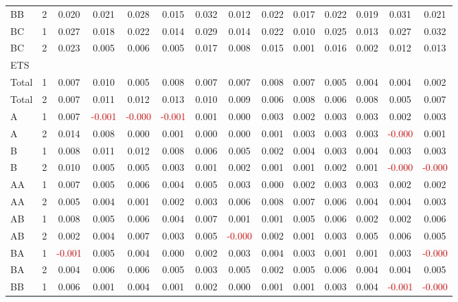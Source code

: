 \begin{table}[!htb]
{\begin{tabular}{llcccccccccccc}
BB & 2 & 0.020 & 0.021 & 0.028 & 0.015 & 0.032 & 0.012 & 0.022 & 0.017 & 0.022 & 0.019 & 0.031 & 0.021\\
BC & 1 & 0.027 & 0.018 & 0.022 & 0.014 & 0.029 & 0.014 & 0.022 & 0.010 & 0.025 & 0.013 & 0.027 & 0.032\\
BC & 2 & 0.023 & 0.005 & 0.006 & 0.005 & 0.017 & 0.008 & 0.015 & 0.001 & 0.016 & 0.002 & 0.012 & 0.013\\
\hline
ETS &  &  &  &  &  &  &  &  &  &  &  &  & \\
\hline
Total & 1 & 0.007 & 0.010 & 0.005 & 0.008 & 0.007 & 0.007 & 0.008 & 0.007 & 0.005 & 0.004 & 0.004 & 0.002\\
Total & 2 & 0.007 & 0.011 & 0.012 & 0.013 & 0.010 & 0.009 & 0.006 & 0.008 & 0.006 & 0.008 & 0.005 & 0.007\\
A & 1 & 0.007 & \textcolor{red}{-0.001} & \textcolor{red}{-0.000} & \textcolor{red}{-0.001} & 0.001 & 0.000 & 0.003 & 0.002 & 0.003 & 0.003 & 0.002 & 0.003\\
A & 2 & 0.014 & 0.008 & 0.000 & 0.001 & 0.000 & 0.000 & 0.001 & 0.003 & 0.003 & 0.003 & \textcolor{red}{-0.000} & 0.001\\
B & 1 & 0.008 & 0.011 & 0.012 & 0.008 & 0.006 & 0.005 & 0.002 & 0.004 & 0.003 & 0.004 & 0.003 & 0.003\\
B & 2 & 0.010 & 0.005 & 0.005 & 0.003 & 0.001 & 0.002 & 0.001 & 0.001 & 0.002 & 0.001 & \textcolor{red}{-0.000} & \textcolor{red}{-0.000}\\
AA & 1 & 0.007 & 0.005 & 0.006 & 0.004 & 0.005 & 0.003 & 0.000 & 0.002 & 0.003 & 0.003 & 0.002 & 0.002\\
AA & 2 & 0.005 & 0.004 & 0.001 & 0.002 & 0.003 & 0.006 & 0.008 & 0.007 & 0.006 & 0.004 & 0.004 & 0.003\\
AB & 1 & 0.008 & 0.005 & 0.006 & 0.004 & 0.007 & 0.001 & 0.001 & 0.005 & 0.006 & 0.002 & 0.002 & 0.006\\
AB & 2 & 0.002 & 0.004 & 0.007 & 0.003 & 0.005 & \textcolor{red}{-0.000} & 0.002 & 0.001 & 0.003 & 0.005 & 0.006 & 0.005\\
BA & 1 & \textcolor{red}{-0.001} & 0.005 & 0.004 & 0.000 & 0.002 & 0.003 & 0.004 & 0.003 & 0.001 & 0.001 & 0.003 & \textcolor{red}{-0.000}\\
BA & 2 & 0.004 & 0.006 & 0.006 & 0.005 & 0.003 & 0.005 & 0.002 & 0.005 & 0.006 & 0.004 & 0.004 & 0.005\\
BB & 1 & 0.006 & 0.001 & 0.004 & 0.001 & 0.002 & 0.000 & 0.001 & 0.001 & 0.003 & 0.004 & \textcolor{red}{-0.001} & \textcolor{red}{-0.000}\\

\end{tabular}}
\end{table}
